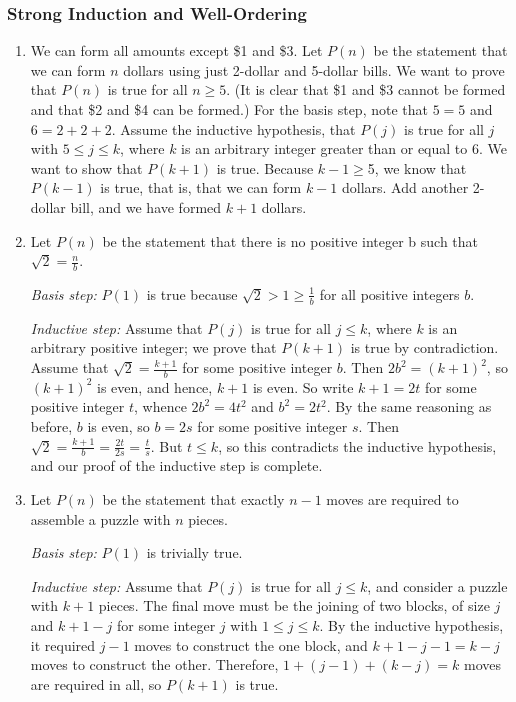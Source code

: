 \documentclass{../../cls/sig-alternate-05-2015}
\begin{document}
\subsubsection{Strong Induction and Well-Ordering}
\begin{enumerate}
\item We can form all amounts except \$1 and \$3. Let $P (n)$
be the statement that we can form $n$ dollars using just 2-dollar
and 5-dollar bills. We want to prove that $P (n)$ is true for all
$n \geq 5$. (It is clear that \$1 and \$3 cannot be formed and that
\$2 and \$4 can be formed.) For the basis step, note that $5 = 5$
and $6 = 2+2+2$. Assume the inductive hypothesis, that $P (j)$
is true for all $j$ with $5 \leq j \leq k$, where $k$ is an arbitrary integer
greater than or equal to $6$. We want to show that $P (k + 1)$ is
true. Because $k-1 \geq $5, we know that $P (k-1)$ is true, that is,
that we can form $k - 1$ dollars. Add another 2-dollar bill, and
we have formed $k + 1$ dollars.
	
	
\item Let $P(n)$ be the statement that there is no positive integer b such that $\sqrt{2} = \frac{n}{b}$.

\textit{Basis step:} $P(1)$ is true because $\sqrt{2} > 1 \ge \frac{1}{b}$ for all positive integers $b$.

\textit{Inductive step:} Assume that $P (j)$ is true for all
$j \le k$,
where $k$ is an arbitrary positive integer;
we prove that $P(k + 1)$ is true by contradiction.
Assume that $\sqrt{2} = \frac{k + 1}{b}$ for some positive integer $b$.
Then $2b^2 = (k + 1)^2$, so $(k + 1)^2$ is even, and hence,
$k + 1$ is even.
So write $k + 1 = 2t$ for some positive integer $t$,
whence $2b^2 = 4t^2$ and $b^2 = 2t^2$.
By the same reasoning as before, $b$ is even,
so $b = 2s$ for some positive integer $s$.
Then $\sqrt{2} = \frac{k + 1}{b} = \frac{2t}{2s} = \frac{t}{s}$.
But $t \le k$,
so this contradicts the inductive hypothesis,
and our proof of the inductive step is complete.

\item Let $P(n)$ be the statement that exactly $n - 1$ moves are required to assemble a puzzle with $n$ pieces.

\textit{Basis step:} $P(1)$ is trivially true.

\textit{Inductive step:} Assume that $P (j)$ is true for all $j \le k$,
and consider a puzzle with $k + 1$ pieces.
The final move must be the joining of two blocks,
of size $j$ and $k + 1 - j$ for some integer $j$ with $1 \le j \le k$.
By the inductive hypothesis,
it required $j - 1$ moves to construct the one block,
and $k + 1 - j - 1 = k - j$ moves to construct the other.
Therefore, $1 + (j - 1) + (k - j) = k$ moves are required in all,
so $P(k + 1)$ is true.


\end{enumerate}
\end{document}
